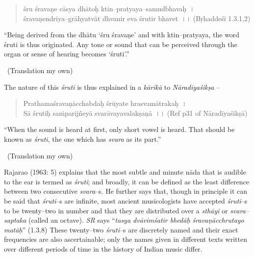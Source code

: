 \begin{verse}
śru śravaṇe cāsya dhātoḥ ktin–pratyaya–samudbhavaḥ~।\\ śravaṇendriya–grāhyatvāt dhvanir eva śrutir bhavet~।। (Bṛhaddeśī 1.3.1,2)
\end{verse}

\begin{myquote}
“Being derived from the dhātu ‘śru śravaṇe’ and with ktin–pratyaya, the word śruti is thus originated. Any tone or sound that can be perceived through the organ or sense of hearing becomes ‘śruti’.” 

~\hfill (Translation my own)
\end{myquote}

The nature of this \textit{śruti} is thus explained in a \textit{kārikā} to \textit{Nāradīyaśikṣa} –

\begin{verse}
Prathamaśravaṇācchabdaḥ śrūyate hrasvamātrakaḥ~।\\ Sā śrutiḥ saṁparijñeyā svarāvayavalakṣaṇā~।। (Ref p31 of Nāradīyaśikṣā)
\end{verse}

\begin{myquote}
“When the sound is heard at first, only short vowel is heard. That should be known as \textit{śruti}, the one which has \textit{svara} as its part.” 

~\hfill (Translation my own)
\end{myquote}

Rajarao (1963: 5) explains that the most subtle and minute nāda that is audible to the ear is termed as \textit{śruti}; and broadly, it can be defined as the least difference between two consecutive \textit{svara}–s. He further says that, though in principle it can be said that \textit{śruti}–s are infinite, most ancient musicologists have accepted \textit{śruti}–s to be twenty–two in number and that they are distributed over a \textit{sthāyi} or \textit{svara–saptaka} (called an octave). \textit{SR} says “\textit{tasya dvāvimśatir bhedāḥ śravaṇācchrutayo matāḥ}” (1.3.8) These twenty–two \textit{śruti}–s are discretely named and their exact frequencies are also ascertainable; only the names given in different texts written over different periods of time in the history of Indian music differ.

